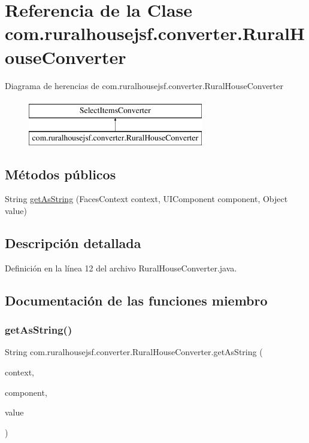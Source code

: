 \hypertarget{a00140}{}\section{Referencia de la Clase com.\+ruralhousejsf.\+converter.\+Rural\+House\+Converter}
\label{a00140}
Diagrama de herencias de com.\+ruralhousejsf.\+converter.\+Rural\+House\+Converter\begin{figure}[H]
\begin{center}
\leavevmode
\includegraphics[height=2.000000cm]{a00140}
\end{center}
\end{figure}
\subsection*{Métodos públicos}
\begin{DoxyCompactItemize}
\item 
String \mbox{\hyperlink{a00140_af5817e782563287dd8f10081cc24215d}{get\+As\+String}} (Faces\+Context context, U\+I\+Component component, Object value)
\end{DoxyCompactItemize}


\subsection{Descripción detallada}


Definición en la línea 12 del archivo Rural\+House\+Converter.\+java.



\subsection{Documentación de las funciones miembro}
\mbox{\label{a00140_af5817e782563287dd8f10081cc24215d}} 
\subsubsection{\texorpdfstring{getAsString()}{getAsString()}}
{\footnotesize\ttfamily String com.\+ruralhousejsf.\+converter.\+Rural\+House\+Converter.\+get\+As\+String (\begin{DoxyParamCaption}\item[{Faces\+Context}]{context,  }\item[{U\+I\+Component}]{component,  }\item[{Object}]{value }\end{DoxyParamCaption})}



